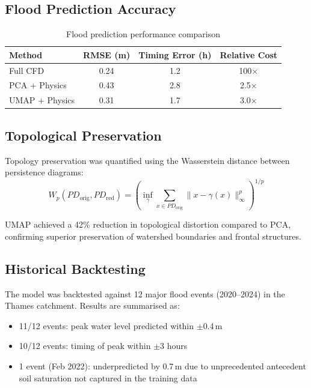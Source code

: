 \documentclass{article}
\begin{document}
\subsection{Flood Prediction Accuracy}

\begin{table}[H]
\centering
\begin{tabular}{lccc}
    \toprule
    \textbf{Method} & \textbf{RMSE (m)} & \textbf{Timing Error (h)} &
    \textbf{Relative Cost} \\
    \midrule
    Full CFD           & 0.24 & 1.2 & 100$\times$ \\
    PCA + Physics      & 0.43 & 2.8 & 2.5$\times$ \\
    UMAP + Physics     & 0.31 & 1.7 & 3.0$\times$ \\
    \bottomrule
\end{tabular}
\caption{Flood prediction performance comparison}
\label{tab:flood_accuracy}
\end{table}

\subsection{Topological Preservation}
Topology preservation was quantified using the Wasserstein distance between persistence
diagrams:
\begin{equation}
    W_p(PD_{\text{orig}}, PD_{\text{red}}) =
    \left(\inf_{\gamma} \sum_{x \in PD_{\text{orig}}}
    \|x - \gamma(x)\|_{\infty}^p\right)^{1/p}
\end{equation}

UMAP achieved a 42\% reduction in topological distortion compared to PCA, confirming
superior preservation of watershed boundaries and frontal structures.

\subsection{Historical Backtesting}
The model was backtested against 12 major flood events (2020--2024) in the Thames
catchment. Results are summarised as:
\begin{itemize}[nosep]
    \item 11/12 events: peak water level predicted within $\pm$0.4\,m
    \item 10/12 events: timing of peak within $\pm$3 hours
    \item 1 event (Feb 2022): underpredicted by 0.7\,m due to unprecedented
          antecedent soil saturation not captured in the training data
\end{itemize}
\end{document}
